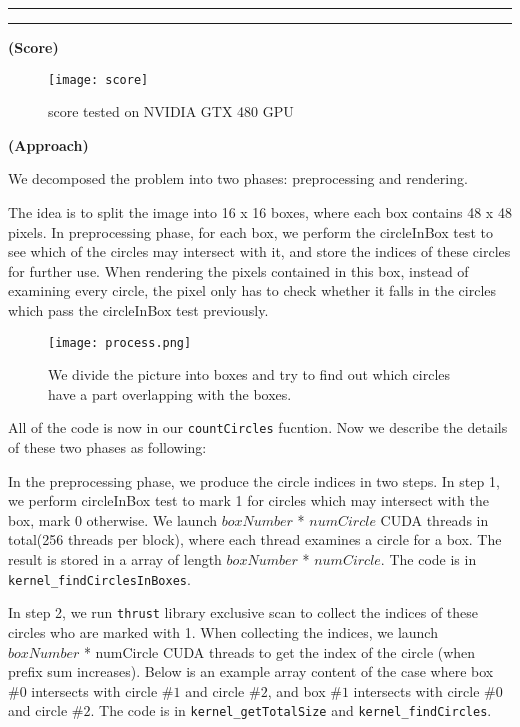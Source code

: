 \documentclass[11pt]{article}
\newcommand{\question}[2] {\vspace{.25in} \hrule\vspace{0.5em}
\noindent{\bf #1: #2} \vspace{0.5em}
\hrule \vspace{.10in}}
\begin{document}
\clearpage

\question{Part 3}{Circle Renderer}



\textbf{(Score)}

\begin{figure}[h!]
\centering
   \texttt{[image: score]}
   \caption{score tested on NVIDIA GTX 480 GPU}
\end{figure}


\textbf{(Approach)}

We decomposed the problem into two phases: preprocessing and rendering.

The idea is to split the image into 16 x 16 boxes, where each box contains 48 x 48 pixels. In preprocessing phase, for each box, we perform the circleInBox test to see which of the circles may intersect with it, and store the indices of these circles for further use. When rendering the pixels contained in this box, instead of examining every circle, the pixel only has to check whether it falls in the circles which pass the circleInBox test previously.

\begin{figure}[H]
\centering
   \texttt{[image: process.png]}
   \caption{We divide the picture into boxes and try to find out which circles have a part overlapping with the boxes.}
\end{figure}


All of the code is now in our \texttt{countCircles} fucntion. Now we describe the details of these two phases as following:

In the preprocessing phase, we produce the circle indices in two steps.
In step 1, we perform circleInBox test to mark 1 for circles which may intersect with the box, mark 0 otherwise.
We launch $boxNumber$ * $numCircle$ CUDA threads in total(256 threads per block), where each thread examines a circle for a box.
The result is stored in a array of length $boxNumber$ * $numCircle$.
The code is in \texttt{kernel\_findCirclesInBoxes}.

In step 2, we run \texttt{thrust} library exclusive scan to collect the indices of these circles who are marked with 1.
When collecting the indices, we launch $boxNumber$ * numCircle CUDA threads to get the index of the circle (when prefix sum increases).
Below is an example array content of the case where box $\#0$ intersects with circle $\#1$ and circle $\#2$, and box $\#1$ intersects with circle $\#0$ and circle $\#2$.
The code is in \texttt{kernel\_getTotalSize} and \texttt{kernel\_findCircles}.
\end{document}
